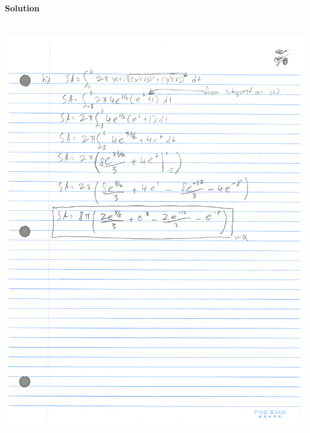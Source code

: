 \documentclass[MATH-115-Notes.tex]{subfiles}
\begin{document}
\begin{enumerate}
\begin{enumerate}
        \paragraph{Solution}~\\
        {\centering\includegraphics[trim={0 14cm 0 0},clip,scale=0.33]{./figures/math-final-work007.jpg}\\}
    \end{enumerate}
\end{enumerate}
\end{document}
